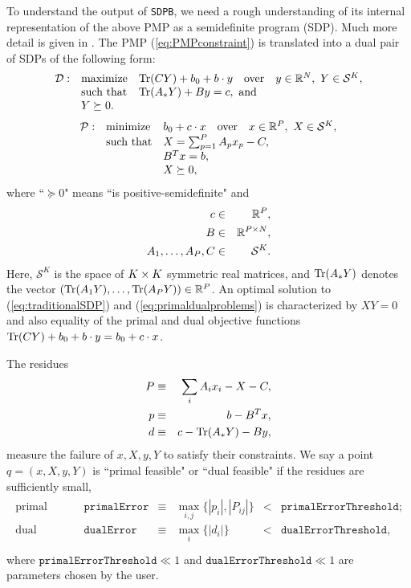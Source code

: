 \documentclass[12pt]{article}
\numberwithin{equation}{section}
\renewcommand{\be}{\begin{eqnarray}}
\renewcommand{\ee}{\end{eqnarray}}
\newcommand\nn{\nonumber}
\newcommand\cS{\mathcal{S}}
\newcommand\SDPB{\texttt{SDPB}}
\begin{document}
To understand the output of \SDPB, we need a rough understanding of its internal representation of the above PMP as a semidefinite program (SDP).  Much more detail is given in \cite{DSD}.
The PMP (\ref{eq:PMPconstraint}) is translated into a dual pair of SDPs of the following form:
\be
\label{eq:traditionalSDP}
\begin{array}{rll}
\cD: & \textrm{maximize} & \Tr(CY) + b_0 + b \. y \quad \textrm{over} \quad y\in \R^N,\ Y\in \cS^K, \\
& \textrm{such that} & \Tr(A_* Y)+By = c,\ \textrm{and}\\
& Y \succeq 0.
\end{array}
\ee 
\be
\label{eq:primaldualproblems}
\begin{array}{rll}
\mathcal{P}: & \textrm{minimize} & b_0+c\.x \quad \textrm{over}\quad x\in \R^P,\ X\in \cS^K,\\
& \textrm{such that} & X= \sum_{p=1}^P A_p x_p - C,\\
& &  B^T x= b,\\
& &  X\succeq 0,
\end{array}
\ee
where ``$\succeq 0$" means ``is positive-semidefinite" and
\be
c &\in& \R^P, \nn\\
B &\in& \R^{P\x N}, \nn\\
A_1,\dots,A_P,C &\in& \cS^K.
\ee
Here, $\cS^K$ is the space of $K\times K$ symmetric real matrices, and $\mathrm{Tr}(A_* Y)$ denotes the vector $(\mathrm{Tr}(A_1 Y),\dots,\mathrm{Tr}(A_P Y))\in\mathbb{R}^P$.  An optimal solution to (\ref{eq:traditionalSDP}) and (\ref{eq:primaldualproblems}) is characterized by $XY=0$ and also equality of the primal and dual objective functions $\mathrm{Tr}(CY)+b_0+b\cdot y=b_0+c\cdot x$.

The residues
\be
\label{eq:residues}
P &\equiv& \sum_i A_i x_i - X - C, \nn\\
p &\equiv& b - B^T x, \nn\\
d &\equiv& c - \Tr(A_* Y) - B y,
\ee
measure the failure of $x,X,y,Y$ to satisfy their constraints.  We say a point $q=(x,X,y,Y)$ is ``primal feasible" or ``dual feasible" if the residues are sufficiently small, 
\be
\begin{array}{rrcccl}
\textrm{primal feasible:} & \texttt{primalError} &\equiv& \max_{i,j}\{|p_i|, |P_{ij}|\} &<& \texttt{primalErrorThreshold};\\
\textrm{dual feasible:} & \texttt{dualError} &\equiv&\max_i\{|d_i|\} &<& \texttt{dualErrorThreshold},\nn\\
\end{array}
\ee
where $\texttt{primalErrorThreshold}\ll 1$ and $\texttt{dualErrorThreshold} \ll 1$ are parameters chosen by the user.
\end{document}
